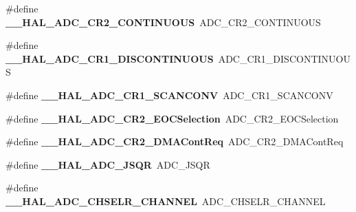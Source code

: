\begin{DoxyCompactItemize}
\#define {\bfseries \+\_\+\+\_\+\+H\+A\+L\+\_\+\+A\+D\+C\+\_\+\+C\+R2\+\_\+\+C\+O\+N\+T\+I\+N\+U\+O\+US}~A\+D\+C\+\_\+\+C\+R2\+\_\+\+C\+O\+N\+T\+I\+N\+U\+O\+US
\item 
\mbox{\label{group___h_a_l___a_d_c___aliased___macros_ga0906f1443571a5dc173f0a1561f514f4}} 
\#define {\bfseries \+\_\+\+\_\+\+H\+A\+L\+\_\+\+A\+D\+C\+\_\+\+C\+R1\+\_\+\+D\+I\+S\+C\+O\+N\+T\+I\+N\+U\+O\+US}~A\+D\+C\+\_\+\+C\+R1\+\_\+\+D\+I\+S\+C\+O\+N\+T\+I\+N\+U\+O\+US
\item 
\mbox{\label{group___h_a_l___a_d_c___aliased___macros_ga92d473f3afb5552b6e4a710410fcb2f1}} 
\#define {\bfseries \+\_\+\+\_\+\+H\+A\+L\+\_\+\+A\+D\+C\+\_\+\+C\+R1\+\_\+\+S\+C\+A\+N\+C\+O\+NV}~A\+D\+C\+\_\+\+C\+R1\+\_\+\+S\+C\+A\+N\+C\+O\+NV
\item 
\mbox{\label{group___h_a_l___a_d_c___aliased___macros_gafb4baec5d5d5ebf891a3cd8a9a0bfe65}} 
\#define {\bfseries \+\_\+\+\_\+\+H\+A\+L\+\_\+\+A\+D\+C\+\_\+\+C\+R2\+\_\+\+E\+O\+C\+Selection}~A\+D\+C\+\_\+\+C\+R2\+\_\+\+E\+O\+C\+Selection
\item 
\mbox{\label{group___h_a_l___a_d_c___aliased___macros_gaedcab24fbd762b1f6b65c7381f910308}} 
\#define {\bfseries \+\_\+\+\_\+\+H\+A\+L\+\_\+\+A\+D\+C\+\_\+\+C\+R2\+\_\+\+D\+M\+A\+Cont\+Req}~A\+D\+C\+\_\+\+C\+R2\+\_\+\+D\+M\+A\+Cont\+Req
\item 
\mbox{\label{group___h_a_l___a_d_c___aliased___macros_ga920c922d2385fcaab11b2ca7c8630da8}} 
\#define {\bfseries \+\_\+\+\_\+\+H\+A\+L\+\_\+\+A\+D\+C\+\_\+\+J\+S\+QR}~A\+D\+C\+\_\+\+J\+S\+QR
\item 
\mbox{\label{group___h_a_l___a_d_c___aliased___macros_gae5547f083abe059cacdcaac3e5066ea2}} 
\#define {\bfseries \+\_\+\+\_\+\+H\+A\+L\+\_\+\+A\+D\+C\+\_\+\+C\+H\+S\+E\+L\+R\+\_\+\+C\+H\+A\+N\+N\+EL}~A\+D\+C\+\_\+\+C\+H\+S\+E\+L\+R\+\_\+\+C\+H\+A\+N\+N\+EL
\item 
\mbox{\label{group___h_a_l___a_d_c___aliased___macros_ga3703e313dbcb2af3dea5a07d622e67c6}} 

\end{DoxyCompactItemize}
